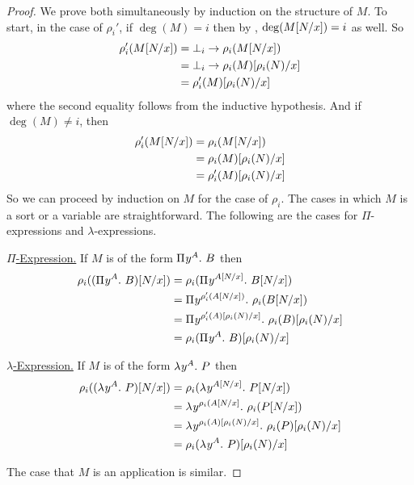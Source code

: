 \documentclass{article}
\begin{document}
\begin{proof}
We prove both simultaneously by induction on the structure of $M$.
To start, in the case of $\rho_i'$, if $\deg(M) = i$ then by , $\deg(M[N/x]) = i$ as well.
So
\begin{align*}
    \rho_i'(M[N/x]) &=
    \bot_i \to \rho_i(M[N/x]) \\ &=
    \bot_i \to \rho_i(M)[\rho_i(N)/x] \\ &=
    \rho_i'(M)[\rho_i(N)/x]
\end{align*}
where the second equality follows from the inductive hypothesis.
And if $\deg(M) \not = i$, then
\begin{align*}
    \rho_i'(M[N/x]) &=
    \rho_i(M[N/x]) \\ &=
    \rho_i(M)[\rho_i(N)/x] \\ &=
    \rho_i'(M)[\rho_i(N)/x]
\end{align*}
So we can proceed by induction on $M$ for the case of $\rho_i$.
The cases in which $M$ is a sort or a variable are straightforward.
The following are the cases for $\Pi$-expressions and $\lambda$-expressions.

\noindent\underline{$\Pi$-Expression.} If $M$ is of the form ${\Pi^{} {y}^{A}. \ {B}}$ then
\begin{align*}
\rho_i(({\Pi^{} {y}^{A}. \ {B}})[N/x]) &=
\rho_i({\Pi^{} {y}^{A[N/x]}. \ {B[N/x]}}) \\ &=
{\Pi^{} {y}^{\rho_i'(A[N/x])}. \ {\rho_i(B[N/x])}} \\ &=
{\Pi^{} {y}^{\rho_i'(A)[\rho_i(N)/x]}. \ {\rho_i(B)[\rho_i(N)/x]}} \\ &=
\rho_i({\Pi^{} {y}^{A}. \ {B}})[\rho_i(N)/x]
\end{align*}

\noindent\underline{$\lambda$-Expression.} If $M$ is of the form $\lambda^{} y^{A}. \ P$ then
\begin{align*}
\rho_i((\lambda^{} y^{A}. \ P)[N/x]) &=
\rho_i(\lambda^{} y^{A[N/x]}. \ P[N/x]) \\ &=
\lambda^{} y^{\rho_i(A[N/x]}. \ \rho_i(P[N/x]) \\ &=
\lambda^{} y^{\rho_i(A)[\rho_i(N)/x]}. \ \rho_i(P)[\rho_i(N)/x] \\ &=
\rho_i(\lambda^{} y^{A}. \ P)[\rho_i(N)/x]
\end{align*}

The case that $M$ is an application is similar.
\end{proof}
\end{document}
